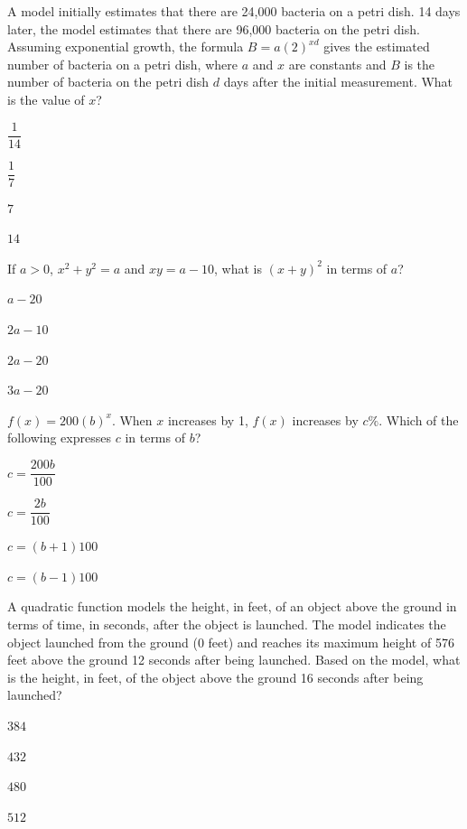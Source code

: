 \vfill
\clearpage
\noindent\begin{minipage}{\linewidth}
\par\smallskip
A model initially estimates that there are 24,000 bacteria on a petri dish. 14 days later, the model estimates that there are 96,000 bacteria on the petri dish. Assuming exponential growth, the formula $B=a(2)^{xd}$ gives the estimated number of bacteria on a petri dish, where $a$ and $x$ are constants and $B$ is the number of bacteria on the petri dish $d$ days after the initial measurement. What is the value of $x$?
\begin{satchoices}
  \item[A)] $\dfrac{1}{14}$
  \item[B)] $\dfrac{1}{7}$
  \item[C)] $7$
  \item[D)] $14$
\end{satchoices}
\end{minipage}
\vfill
\noindent\begin{minipage}{\linewidth}
\par\smallskip
If $a>0$, $x^2+y^2=a$ and $xy=a-10$, what is $(x+y)^2$ in terms of $a$?
\begin{satchoices}
  \item[A)] $a-20$
  \item[B)] $2a-10$
  \item[C)] $2a-20$
  \item[D)] $3a-20$
\end{satchoices}
\end{minipage}
\vfill
\noindent\begin{minipage}{\linewidth}
\par\smallskip
$f(x)=200(b)^x$. When $x$ increases by 1, $f(x)$ increases by $c\%$. Which of the following expresses $c$ in terms of $b$?
\begin{satchoices}
  \item[A)] $c=\dfrac{200b}{100}$
  \item[B)] $c=\dfrac{2b}{100}$
  \item[C)] $c=(b+1)100$
  \item[D)] $c=(b-1)100$
\end{satchoices}
\end{minipage}
\vfill
\clearpage
\noindent\begin{minipage}{\linewidth}
\par\smallskip
A quadratic function models the height, in feet, of an object above the ground in terms of time, in seconds, after the object is launched. The model indicates the object launched from the ground (0 feet) and reaches its maximum height of 576 feet above the ground 12 seconds after being launched. Based on the model, what is the height, in feet, of the object above the ground 16 seconds after being launched?
\begin{satchoices}
  \item[A)] $384$
  \item[B)] $432$
  \item[C)] $480$
  \item[D)] $512$
\end{satchoices}
\end{minipage}
